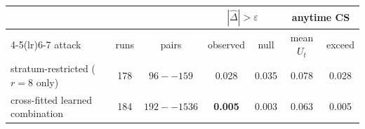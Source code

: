 \begin{tabular}{lcccccc}
\toprule
& & & \multicolumn{2}{c}{$|\hat\Delta| > \varepsilon$} & \multicolumn{2}{c}{anytime CS}\\
\cmidrule(lr){4-5}\cmidrule(lr){6-7}
attack & runs & pairs & observed & null & mean $U_t$ & exceed\\
\midrule
stratum-restricted ($r=8$ only) & 178 & $96--159$ & 0.028 & 0.035 & 0.078 & 0.028\\
cross-fitted learned combination & 184 & $192--1536$ & \textbf{0.005} & 0.003 & 0.063 & 0.005\\
\bottomrule
\end{tabular}
